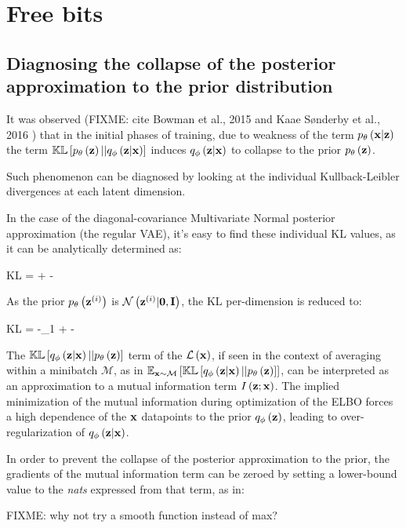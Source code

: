 \section{Free bits}

\subsection{Diagnosing the collapse of the posterior approximation to the prior distribution}

It was observed\cite{Kingma2017}\cite{1611.02731} (FIXME: cite Bowman et al., 2015 and Kaae Sønderby et al., 2016 )
that in the initial phases of training, due to weakness of the term $p_\theta\left(\mathbf{x}|\mathbf{z}\right)$ the term $\mathbb{KL}\left[ p_\theta\left(\mathbf{z}\right) || q_\phi\left(\mathbf{z}|\mathbf{x}\right) \right]$ 
induces $q_\phi\left(\mathbf{z}|\mathbf{x}\right)$ to collapse to the prior $p_\theta\left(\mathbf{z}\right)$.

Such phenomenon can be diagnosed by looking at the individual Kullback-Leibler divergences
at each latent dimension.

In the case of the diagonal-covariance Multivariate Normal posterior approximation
(the regular VAE), it's easy to find these individual KL values, as it can be analytically determined as:

\begin{nalign}
KL = \log {} + -
\end{nalign}

As the prior $p_\theta\left({\mathbf{z}^{(i)}}\right)$ is $\mathcal{N}\left({\mathbf{z}^{(i)}}|\mathbf{0},\mathbf{I}\right)$, the KL per-dimension is reduced to:

\begin{nalign}
KL = -\log \sigma_1 + -
\end{nalign}

 The $\mathbb{KL}\left[ q_\phi\left(\mathbf{z}|\mathbf{x}\right) || p_\theta\left(\mathbf{z}\right) \right]$ term of the $\mathcal{L}\left(\mathbf{x}\right)$, if seen in the context of averaging within a minibatch $\mathcal{M}$, as in
 $\mathbb{E}_{\mathbf{x}\sim\mathcal{M}}\left[ \mathbb{KL}\left[ q_\phi\left(\mathbf{z}|\mathbf{x}\right) || p_\theta\left(\mathbf{z}\right) \right] \right]$,
 can be interpreted as an approximation to a mutual information term $I\left( \mathbf{z} ; \mathbf{x} \right)$.
 The implied minimization of the mutual information during optimization of the ELBO forces a high dependence of the $\mathbf{x}$ datapoints to the prior $q_\phi\left(\mathbf{z}\right)$,
 leading to over-regularization of $q_\phi\left(\mathbf{z}|\mathbf{x}\right)$.

 In order to prevent the collapse of the posterior approximation to the prior, the gradients of the mutual information term can be zeroed by setting a lower-bound
 value to the \emph{nats} expressed from that term, as in:
\begin{nalign}
     \max\left[\lambda,\expectxM{\kl{\qzcond}{\pzonly}}\right]
\end{nalign}

FIXME: why not try a smooth function instead of max?
